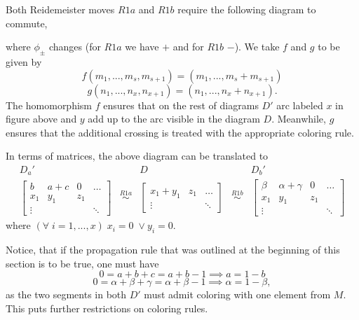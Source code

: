 Both Reidemeister moves $R1a$ and $R1b$ require the following diagram to commute,
\begin{center}
\end{center}
where $\phi_\pm$ changes (for $R1a$ we have $+$ and for $R1b$ $-$). We take $f$ and $g$ to be given by
$$f(m_1,..., m_s, m_{s+1})=(m_1,..., m_s+m_{s+1})$$
$$g(n_1,..., n_x, n_{x+1})=(n_1,..., n_x+n_{x+1}).$$
The homomorphism $f$ ensures that on the rest of diagrams $D'$ arc labeled $x$ in figure above and $y$ add up to the arc visible in the diagram $D$. Meanwhile, $g$ ensures that the additional crossing is treated with the appropriate coloring rule.

In terms of matrices, the above diagram can be translated to
$$
\begin{matrix}
  D_a' & & D & & D_b'\\ 
  \begin{bmatrix}
    b & a+c  & 0 & \hdots\\ 
    x_1 & y_1 & z_1 \\ 
    \vdots & & & \ddots
  \end{bmatrix} 
       & \overset{R1a}{\sim} &
     \begin{bmatrix}
       x_1 + y_1 & z_1 & \hdots\\ 
       \vdots & & \ddots
     \end{bmatrix} 
       & \overset{R1b}{\sim} &
  \begin{bmatrix}
    \beta & \alpha+\gamma  & 0 & \hdots\\ 
    x_1 & y_1 & z_1 \\ 
    \vdots & & & \ddots
  \end{bmatrix} 
\end{matrix}
$$
where $(\forall\;i=1,...,x)\;x_i=0\;\lor y_i=0$.

Notice, that if the propagation rule that was outlined at the beginning of this section is to be true, one must have
$$0=a+b+c=a+b-1\implies a=1-b$$
$$0=\alpha+\beta+\gamma=\alpha+\beta-1\implies \alpha=1-\beta,$$
as the two segments in both $D'$ must admit coloring with one element from $M$. This puts further restrictions on coloring rules.

